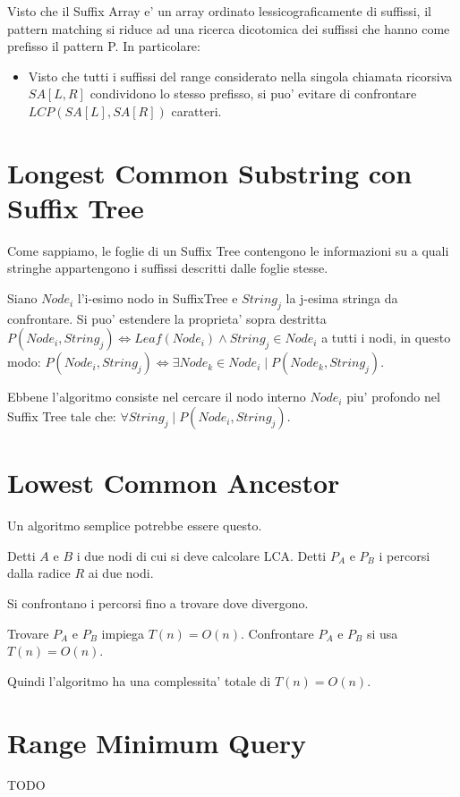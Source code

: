 Visto che il Suffix Array e' un array ordinato lessicograficamente di suffissi, il pattern matching si riduce ad una ricerca dicotomica dei suffissi che hanno come prefisso il pattern P.
In particolare:

\begin{itemize}
    \item Visto che tutti i suffissi del range considerato nella singola chiamata ricorsiva $SA[L, R]$ condividono lo stesso prefisso, si puo' evitare di confrontare $LCP(SA[L], SA[R])$ caratteri.

\end{itemize}

\section{Longest Common Substring con Suffix Tree}

Come sappiamo, le foglie di un Suffix Tree contengono le informazioni su a quali stringhe appartengono i suffissi descritti dalle foglie stesse.

Siano $Node_i$ l'i-esimo nodo in SuffixTree e $String_j$ la j-esima stringa da confrontare.
Si puo' estendere la proprieta' sopra destritta $P(Node_i, String_j) \Leftrightarrow Leaf(Node_i) \land String_j \in Node_i$ a tutti i nodi, in questo modo:
$P(Node_i, String_j) \Leftrightarrow \exists Node_k \in Node_i \mid P(Node_k, String_j)$.

Ebbene l'algoritmo consiste nel cercare il nodo interno $Node_i$ piu' profondo nel Suffix Tree tale che:
$\forall String_j \mid P(Node_i, String_j)$.

\section{Lowest Common Ancestor}

Un algoritmo semplice potrebbe essere questo.

Detti $A$ e $B$ i due nodi di cui si deve calcolare LCA.
Detti $P_{A}$ e $P_{B}$ i percorsi dalla radice $R$ ai due nodi.

Si confrontano i percorsi fino a trovare dove divergono.

Trovare $P_{A}$ e $P_{B}$ impiega $T(n) = O(n)$.
Confrontare $P_{A}$ e $P_{B}$ si usa $T(n) = O(n)$.

Quindi l'algoritmo ha una complessita' totale di $T(n) = O(n)$.

\section{Range Minimum Query}

TODO

